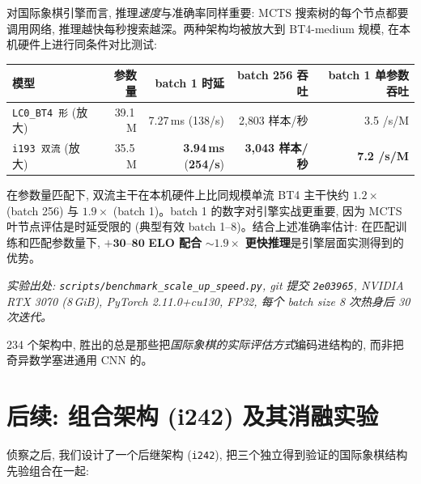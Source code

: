 \documentclass[10pt,a4paper]{article}
\begin{document}
\begin{tcolorbox}[goodcallout, title=现实预期 --- 速度 (实测)]
对国际象棋引擎而言, 推理\emph{速度}与准确率同样重要: MCTS 搜索树的每个节点都要调用网络, 推理越快每秒搜索越深。两种架构均被放大到 BT4-medium 规模, 在本机硬件上进行同条件对比测试:

\begin{footnotesize}
\begin{tabularx}{\linewidth}{@{}L r r r r@{}}
\toprule
\textbf{模型} & \textbf{参数量} & \textbf{batch 1 时延} & \textbf{batch 256 吞吐} & \textbf{batch 1 单参数吞吐} \\
\midrule
\texttt{LC0\_BT4 形} (放大) & 39.1\,M & 7.27\,ms (138/s) & 2{,}803 样本/秒 & 3.5 /s/M \\
\texttt{i193 双流} (放大) & 35.5\,M & \textbf{3.94\,ms} (\textbf{254/s}) & \textbf{3{,}043 样本/秒} & \textbf{7.2 /s/M} \\
\bottomrule
\end{tabularx}
\end{footnotesize}

\medskip
在参数量匹配下, 双流主干在本机硬件上比同规模单流 BT4 主干快约 $\mathbf{1.2}\times$ (batch 256) 与 $\mathbf{1.9}\times$ (batch 1)。batch 1 的数字对引擎实战更重要, 因为 MCTS 叶节点评估是时延受限的 (典型有效 batch 1--8)。结合上述准确率估计: 在匹配训练和匹配参数量下, $\mathbf{+30}$--$\mathbf{80}$ \textbf{ELO 配合} $\mathbf{\sim 1.9 \times}$ \textbf{更快推理}是引擎层面实测得到的优势。

\vspace{2pt}
{\scriptsize\textit{实验出处: \texttt{scripts/benchmark\_scale\_up\_speed.py}, git 提交 \texttt{2e03965}, NVIDIA RTX 3070 (8\,GiB), PyTorch 2.11.0+cu130, FP32, 每个 batch size 8 次热身后 30 次迭代。}}
\end{tcolorbox}

\begin{tcolorbox}[callout, title=一句话结论]
234 个架构中, 胜出的总是那些把\emph{国际象棋的实际评估方式}编码进结构的, 而非把奇异数学塞进通用 CNN 的。
\end{tcolorbox}

\clearpage
\section{后续: 组合架构 (i242) 及其消融实验}

侦察之后, 我们设计了一个后继架构 (\texttt{i242}), 把三个独立得到验证的国际象棋结构先验组合在一起:
\end{document}

